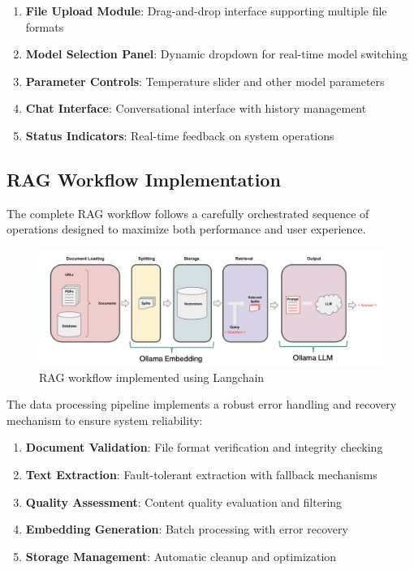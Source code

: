 \documentclass[12pt,letterpaper]{article}
\begin{document}
\begin{enumerate}
    \item \textbf{File Upload Module}: Drag-and-drop interface supporting multiple file formats
    \item \textbf{Model Selection Panel}: Dynamic dropdown for real-time model switching
    \item \textbf{Parameter Controls}: Temperature slider and other model parameters
    \item \textbf{Chat Interface}: Conversational interface with history management
    \item \textbf{Status Indicators}: Real-time feedback on system operations
\end{enumerate}

\subsection{RAG Workflow Implementation}

The complete RAG workflow follows a carefully orchestrated sequence of operations designed to maximize both performance and user experience.

\begin{figure}[H]
    \centering
    \includegraphics[width=1\textwidth]{plots/Langchain.png}
    \caption{RAG workflow implemented using Langchain}
    \label{fig:rag_workflow}
\end{figure}


The data processing pipeline implements a robust error handling and recovery mechanism to ensure system reliability:

\begin{enumerate}
    \item \textbf{Document Validation}: File format verification and integrity checking
    \item \textbf{Text Extraction}: Fault-tolerant extraction with fallback mechanisms
    \item \textbf{Quality Assessment}: Content quality evaluation and filtering
    \item \textbf{Embedding Generation}: Batch processing with error recovery
    \item \textbf{Storage Management}: Automatic cleanup and optimization
\end{enumerate}
\end{document}

